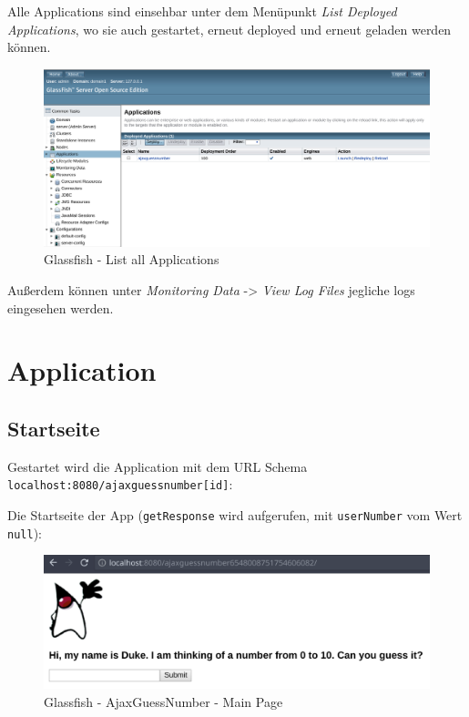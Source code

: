 Alle Applications sind einsehbar unter dem Menüpunkt \textit{List Deployed Applications}, wo sie auch gestartet, erneut deployed und erneut geladen werden können.

\begin{figure}
    \centering
    \includegraphics[width=\textwidth]{images/glassfish-apps}
    \caption{Glassfish - List all Applications}
\end{figure}

Außerdem können unter \textit{Monitoring Data} -> \textit{View Log Files} jegliche logs eingesehen werden.



\clearpage
\section{Application}

\subsection{Startseite}

Gestartet wird die Application mit dem URL Schema \texttt{localhost:8080/ajaxguessnumber[id]}:

Die Startseite der App (\texttt{getResponse} wird aufgerufen, mit \texttt{userNumber} vom Wert \texttt{null}):
\begin{figure}
    \centering
    \includegraphics[width=\textwidth]{images/app-main}
    \caption{Glassfish - AjaxGuessNumber - Main Page}
\end{figure}

